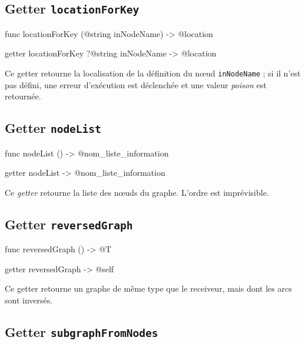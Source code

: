 \subsection{Getter \texttt{locationForKey}}

\begin{galgas4}
func locationForKey (@string inNodeName) -> @location
\end{galgas4}

\begin{galgas4}
getter locationForKey ?@string inNodeName -> @location
\end{galgas4}

Ce getter retourne la localisation de la définition du nœud \texttt{inNodeName} ; si il n'est pas défini, une erreur d'exécution est déclenchée et une valeur \emph{poison} est retournée.


\subsection{Getter \texttt{nodeList}}

\begin{galgas4}
func nodeList () -> @nom_liste_information
\end{galgas4}

\begin{galgas4}
getter nodeList -> @nom_liste_information
\end{galgas4}

Ce \emph{getter} retourne la liste des nœuds du graphe. L'ordre est imprévisible.




\subsection{Getter \texttt{reversedGraph}}

\begin{galgas4}
func reversedGraph () -> @T
\end{galgas4}

\begin{galgas4}
getter reversedGraph -> @self
\end{galgas4}

Ce getter retourne un graphe de même type que le receiveur, mais dont les arcs sont inversés.





\subsection{Getter \texttt{subgraphFromNodes}}

